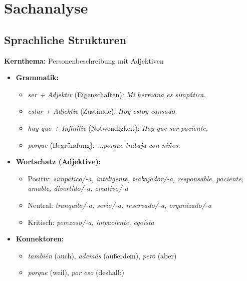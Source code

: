 \documentclass[11pt,a4paper]{article}
\begin{document}
\section{Sachanalyse}

\subsection{Sprachliche Strukturen}

\textbf{Kernthema:} Personenbeschreibung mit Adjektiven

\begin{itemize}
    \item \textbf{Grammatik:}
    \begin{itemize}
        \item \textit{ser + Adjektiv} (Eigenschaften): \textit{Mi hermana es simpática.}
        \item \textit{estar + Adjektiv} (Zustände): \textit{Hoy estoy cansado.}
        \item \textit{hay que + Infinitiv} (Notwendigkeit): \textit{Hay que ser paciente.}
        \item \textit{porque} (Begründung): \textit{...porque trabaja con niños.}
    \end{itemize}

    \item \textbf{Wortschatz (Adjektive):}
    \begin{itemize}
        \item Positiv: \textit{simpático/-a, inteligente, trabajador/-a, responsable, paciente, amable, divertido/-a, creativo/-a}
        \item Neutral: \textit{tranquilo/-a, serio/-a, reservado/-a, organizado/-a}
        \item Kritisch: \textit{perezoso/-a, impaciente, egoísta}
    \end{itemize}

    \item \textbf{Konnektoren:}
    \begin{itemize}
        \item \textit{también} (auch), \textit{además} (außerdem), \textit{pero} (aber)
        \item \textit{porque} (weil), \textit{por eso} (deshalb)
    \end{itemize}
\end{itemize}
\end{document}

